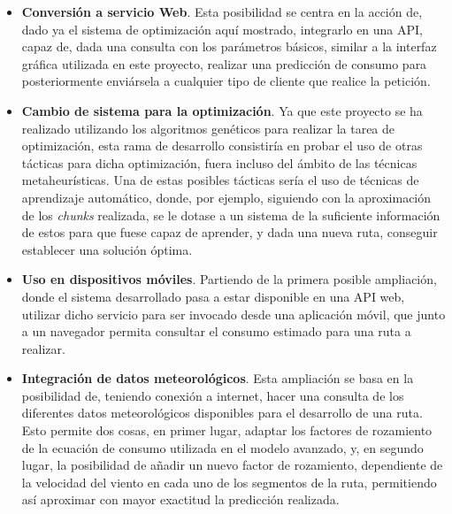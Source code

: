 \documentclass[11pt,spanish,listoffigures,listoftables]{tfgetsinf}
\begin{document}
\begin{itemize}
    \item \textbf{Conversión a servicio Web}. Esta posibilidad se centra en la acción de, dado ya el sistema de optimización aquí mostrado, integrarlo en una API, capaz de, dada una consulta con los parámetros básicos, similar a la interfaz gráfica utilizada en este proyecto, realizar una predicción de consumo para posteriormente enviársela a cualquier tipo de cliente que realice la petición.
    
    \item \textbf{Cambio de sistema para la optimización}. Ya que este proyecto se ha realizado utilizando los algoritmos genéticos para realizar la tarea de optimización, esta rama de desarrollo consistiría en probar el uso de otras tácticas para dicha optimización, fuera incluso del ámbito de las técnicas metaheurísticas. Una de estas posibles tácticas sería el uso de técnicas de aprendizaje automático, donde, por ejemplo, siguiendo con la aproximación de los \textit{chunks} realizada, se le dotase a un sistema de la suficiente información de estos para que fuese capaz de aprender, y dada una nueva ruta, conseguir establecer una solución óptima.
    
    \item \textbf{Uso en dispositivos móviles}. Partiendo de la primera posible ampliación, donde el sistema desarrollado pasa a estar disponible en una API web, utilizar dicho servicio para ser invocado desde una aplicación móvil, que junto a un navegador permita consultar el consumo estimado para una ruta a realizar.
    
    \item \textbf{Integración de datos meteorológicos}. Esta ampliación se basa en la posibilidad de, teniendo conexión a internet, hacer una consulta de los diferentes datos meteorológicos disponibles para el desarrollo de una ruta. Esto permite dos cosas, en primer lugar, adaptar los factores de rozamiento de la ecuación de consumo utilizada en el modelo avanzado, y, en segundo lugar, la posibilidad de añadir un nuevo factor de rozamiento, dependiente de la velocidad del viento en cada uno de los segmentos de la ruta, permitiendo así aproximar con mayor exactitud la predicción realizada.
\end{itemize}


\nocite{*}
\printbibliography
\end{document}
